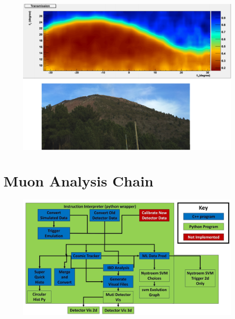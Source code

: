 \begin{figure}[htbp]
 \centering
 \includegraphics[width=1.0\linewidth]{Chapter5/Figs/Raster/mtVesuviusMuRayTransmission.png}
 \label{fig:mtVesuviusMuRayTransmission}
\end{figure}

\section{Muon Analysis Chain}\label{sec:muonAnalysisChain}

\begin{figure}[htbp]
 \centering
 \includegraphics[width=1.0\linewidth]{Chapter5/Figs/Raster/analysisChain.jpg}
 \label{fig:analysisChain}
\end{figure}

